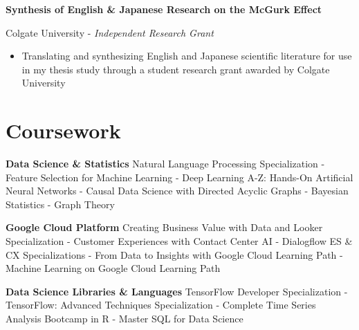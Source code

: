 \documentclass[a4paper,9pt]{extarticle}
\begin{document}
\noindent\textbf{Synthesis of English \& Japanese Research on the McGurk Effect}

Colgate University - \textit{Independent Research Grant}
\begin{itemize}
\item Translating and synthesizing English and Japanese scientific literature for use in my thesis study through a student research grant awarded by Colgate University
\end{itemize}

\section*{Coursework}
\noindent\textbf{Data Science \& Statistics}
Natural Language Processing Specialization - Feature Selection for Machine Learning - Deep Learning A-Z: Hands-On Artificial Neural Networks - Causal Data Science with Directed Acyclic Graphs - Bayesian Statistics - Graph Theory

\noindent\textbf{Google Cloud Platform}
Creating Business Value with Data and Looker Specialization - Customer Experiences with Contact Center AI - Dialogflow ES \& CX Specializations - From Data to Insights with Google Cloud Learning Path - Machine Learning on Google Cloud Learning Path

\noindent\textbf{Data Science Libraries \& Languages}
TensorFlow Developer Specialization - TensorFlow: Advanced Techniques Specialization - Complete Time Series Analysis Bootcamp in R - Master SQL for Data Science
\end{document}
